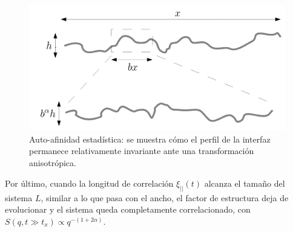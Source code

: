 \begin{figure}[!b]
    \centering
    \includegraphics[width=\imsize]{self_aff.png}
    \caption[Auto-afinidad estadística.]{Auto-afinidad estadística: se muestra cómo el perfil de la interfaz permanece relativamente invariante ante una transformación anisotrópica.}
    \label{fig:self_aff}
\end{figure}

Por último, cuando la longitud de correlación $\xi_{||}(t)$ alcanza el tamaño del sistema $L$, similar a lo que pasa con el ancho, el factor de estructura deja de evolucionar y el sistema queda completamente correlacionado, con $S(q,t \gg t_x)\propto q^{-(1+2\alpha)}$.



